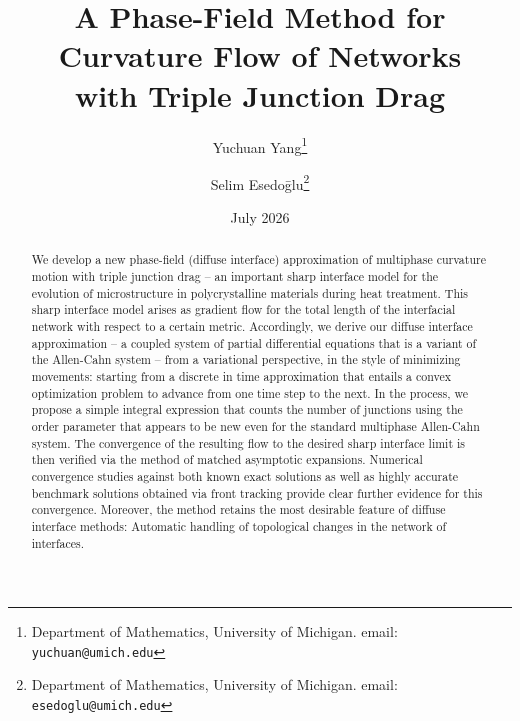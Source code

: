 \documentclass{article}
\title{A Phase-Field Method for Curvature Flow of Networks\\ with Triple Junction Drag}
\author{Yuchuan Yang\thanks{{Department of Mathematics, University of Michigan. email: \texttt{yuchuan@umich.edu}}} \and Selim Esedo\={g}lu\thanks{Department of Mathematics, University of Michigan. email: \texttt{esedoglu@umich.edu}}}
\date{July 2026}
\theoremstyle{plain}
\theoremstyle{definition}
\theoremstyle{remark}
\begin{document}

\maketitle


\begin{abstract}
We develop a new phase-field (diffuse interface) approximation of multiphase curvature motion with triple junction drag -- an important sharp interface model for the evolution of microstructure in polycrystalline materials during heat treatment.
This sharp interface model arises as gradient flow for the total length of the interfacial network with respect to a certain metric.
Accordingly, we derive our diffuse interface approximation -- a coupled system of partial differential equations  that is a variant of the Allen-Cahn system -- from a variational perspective, in the style of minimizing movements: starting from a discrete in time approximation that entails a convex optimization problem to advance from one time step to the next.
In the process, we propose a simple integral expression that counts the number of junctions using the order parameter that appears to be new even for the standard multiphase Allen-Cahn system.
The convergence of the resulting flow to the desired sharp interface limit is then verified via the method of matched asymptotic expansions.
Numerical convergence studies against both known exact solutions as well as highly accurate benchmark solutions obtained via front tracking provide clear further evidence for this convergence.
Moreover, the method retains the most desirable feature of diffuse interface methods: Automatic handling of topological changes in the network of interfaces.
\end{abstract}
\end{document}
